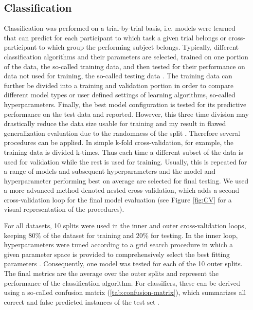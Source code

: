 \subsection{Classification}
Classification was performed on a trial-by-trial basis, i.e. models were learned that can predict for each participant to which task a given trial belongs or cross-participant to which group the performing subject belongs. Typically, different classification algorithms and their parameters are selected, trained on one portion of the data, the so-called training data, and then tested for their performance on data not used for training, the so-called testing data \cite{Daumé2017}. The training data can further be divided into a training and validation portion in order to compare different model types or user defined settings of learning algorithms, so-called hyperparameters. Finally, the best model configuration is tested for its predictive performance on the test data and reported. However, this three time division may drastically reduce the data size usable for training and my result in flawed generalization evaluation due to the randomness of the split \cite{VAROQUAUX2017166}. Therefore several procedures can be applied. In simple k-fold cross-validation, for example, the training data is divided k-times. Thus each time a different subset of the data is used for validation while the rest is used for training. Usually, this is repeated for a range of models and subsequent hyperparameters and the model and hyperparameter performing best on average are selected for final testing. We used a more advanced method denoted nested cross-validation, which adds a second cross-validation loop for the final model evaluation (see Figure \ref{fig:CV} for a visual representation of the procedures).

\begin{figure*}[h]
   
  \caption[Nested cross-validation procedure]{Nested cross-validation procedure. CV: cross-validation}
  \label{fig:CV}
\end{figure*}

For all datasets, 10 splits were used in the inner and outer cross-validation loops, keeping 80\% of the dataset for training and 20\% for testing. In the inner loop, hyperparameters were tuned according to a grid search procedure in which a given parameter space is provided to comprehensively select the best fitting parameters \cite{VAROQUAUX2017166}. Consequently, one model was tested for each of the 10 outer splits. The final metrics are the average over the outer splits and represent the performance of the classification algorithm. For classifiers, these can be derived using a so-called confusion matrix (\autoref{tab:confusion-matrix}), which summarizes all correct and false predicted instances of the test set \cite{Fawcett2006}.  

